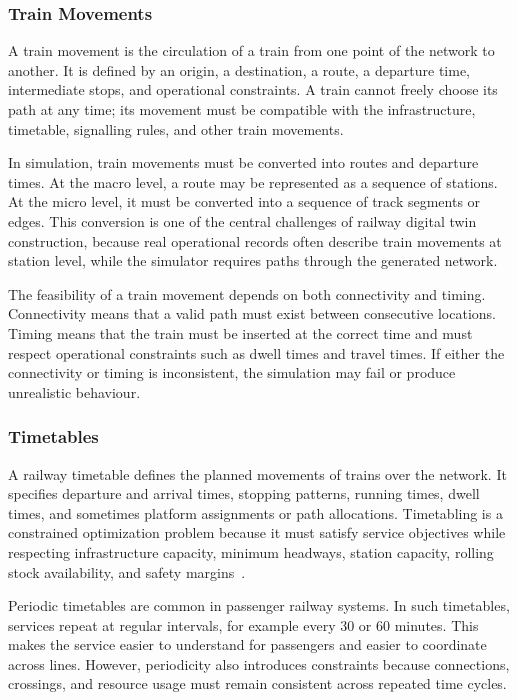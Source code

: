 \subsubsection{Train Movements}
A train movement is the circulation of a train from one point of the network to another. It is defined by an origin, a 
destination, a route, a departure time, intermediate stops, and operational constraints. A train cannot freely choose its 
path at any time; its movement must be compatible with the infrastructure, timetable, signalling rules, and other train 
movements.

In simulation, train movements must be converted into routes and departure times. At the macro level, a route may be 
represented as a sequence of stations. At the micro level, it must be converted into a sequence of track segments or edges. 
This conversion is one of the central challenges of railway digital twin construction, because real operational records 
often describe train movements at station level, while the simulator requires paths through the generated network.

The feasibility of a train movement depends on both connectivity and timing. Connectivity means that a valid path must 
exist between consecutive locations. Timing means that the train must be inserted at the correct time and must respect 
operational constraints such as dwell times and travel times. If either the connectivity or timing is inconsistent, the 
simulation may fail or produce unrealistic behaviour.

\subsubsection{Timetables}
A railway timetable defines the planned movements of trains over the network. It specifies departure and arrival times, 
stopping patterns, running times, dwell times, and sometimes platform assignments or path allocations. Timetabling is a 
constrained optimization problem because it must satisfy service objectives while respecting infrastructure capacity, 
minimum headways, station capacity, rolling stock availability, and safety margins~\cite{hansen2014railway}.

Periodic timetables are common in passenger railway systems. In such timetables, services repeat at regular intervals, 
for example every 30 or 60 minutes. This makes the service easier to understand for passengers and easier to coordinate 
across lines. However, periodicity also introduces constraints because connections, crossings, and resource usage must 
remain consistent across repeated time cycles.

